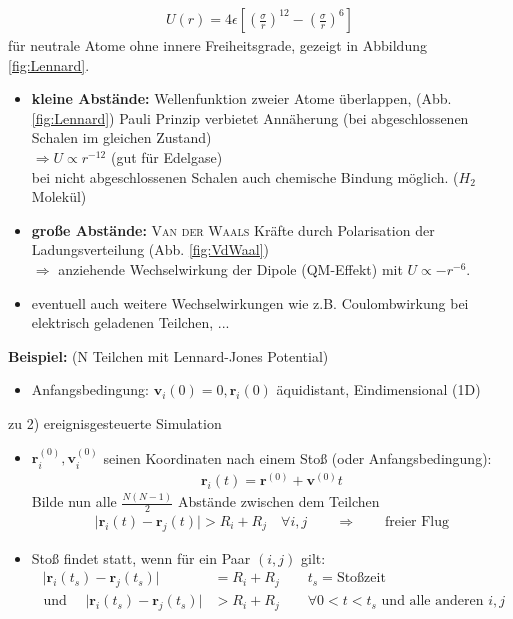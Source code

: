 \documentclass[12pt]{article}
\begin{document}
\begin{align}
U(r) = 
4 \epsilon 
\left[ \left(  \frac{ \sigma }{r}  \right)^{12} - \left( \frac{\sigma }{r} \right)^6 \right]
\end{align}
für neutrale Atome ohne innere Freiheitsgrade, gezeigt in Abbildung \ref{fig:Lennard}.
\begin{itemize}
\item \textbf{kleine Abstände:} Wellenfunktion zweier Atome überlappen, (Abb. \ref{fig:Lennard})
 Pauli Prinzip verbietet Annäherung (bei abgeschlossenen Schalen im gleichen Zustand) \\ $\Rightarrow U \propto r^{-12}$ (gut für Edelgase) \\ bei nicht abgeschlossenen Schalen auch chemische Bindung möglich. ($H_2$ Molekül)
\item \textbf{große Abstände:} \textsc{Van der Waals} Kräfte durch Polarisation der Ladungsverteilung (Abb. \ref{fig:VdWaal}) \\
$\Rightarrow$ anziehende Wechselwirkung der Dipole (QM-Effekt) mit $U \propto - r^{-6}$.
\item eventuell auch weitere Wechselwirkungen wie z.B. Coulombwirkung bei elektrisch geladenen Teilchen, ...
\end{itemize}
\textbf{Beispiel:} (N Teilchen mit Lennard-Jones Potential)
\begin{itemize}
\item Anfangsbedingung: $\mathbf{v}_i (0)=0, \mathbf{r}_i (0)$ äquidistant, Eindimensional (1D) 
\end{itemize} %
zu 2) ereignisgesteuerte Simulation
\begin{itemize}
\item $\mathbf{r}_i^{(0)}, \mathbf{v}_i^{(0)}$ seinen Koordinaten nach einem Stoß (oder Anfangsbedingung): 
\begin{align*}
\mathbf{r}_i (t) = \mathbf{r}^{(0)} + \mathbf{v}^{(0)} t
\end{align*} Bilde nun alle $\frac{N(N-1)}{2}$ Abstände zwischen dem Teilchen 
\begin{align*}
\vert \mathbf{r}_i (t) - \mathbf{r}_j (t) \vert > R_i + R_j \quad \forall i,j \qquad \Rightarrow \qquad  \text{freier Flug}
\end{align*}
\item Stoß findet statt, wenn für ein Paar $(i,j)$ gilt:
\begin{align*}
\; \vert \mathbf{r}_i (t_s) - \mathbf{r}_j (t_s) \vert &= R_i + R_j   \qquad t_s = \text{Stoßzeit} \\
\text{ und } \quad  \vert \mathbf{r}_i (t_s) - \mathbf{r}_j (t_s) \vert &> R_i + R_j \qquad \forall 0< t < t_s \text{ und alle anderen } i,j
\end{align*} 
\end{itemize}
\end{document}
